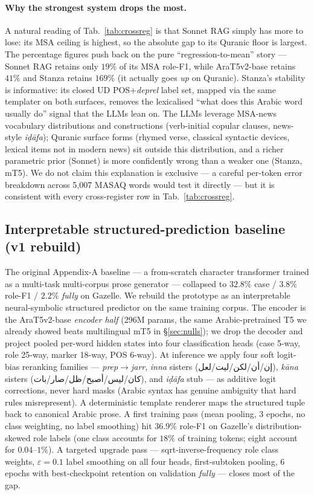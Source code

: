 \documentclass[10pt,a4paper,twocolumn]{article}
\providecommand{\textarabic}[1]{{\arabicfont #1}}
\begin{document}
\paragraph{Why the strongest system drops the most.} A natural reading of Tab.~\ref{tab:crossreg} is that Sonnet RAG simply has more to lose: its MSA ceiling is highest, so the absolute gap to its Quranic floor is largest. The percentage figures push back on the pure ``regression-to-mean'' story --- Sonnet RAG retains only $19\%$ of its MSA role-F1, while AraT5v2-base retains $41\%$ and Stanza retains $169\%$ (it actually goes \emph{up} on Quranic). Stanza's stability is informative: its closed UD POS+\emph{deprel} label set, mapped via the same templater on both surfaces, removes the lexicalised ``what does this Arabic word usually do'' signal that the LLMs lean on. The LLMs leverage MSA-news vocabulary distributions and constructions (verb-initial copular clauses, news-style \emph{i\d{d}\=afa}); Quranic surface forms (rhymed verse, classical syntactic devices, lexical items not in modern news) sit outside this distribution, and a richer parametric prior (Sonnet) is more confidently wrong than a weaker one (Stanza, mT5). We do not claim this explanation is exclusive --- a careful per-token error breakdown across 5{,}007 MASAQ words would test it directly --- but it is consistent with every cross-register row in Tab.~\ref{tab:crossreg}.

\subsection{Interpretable structured-prediction baseline (v1 rebuild)}
\label{sec:rebuild}

The original Appendix-A baseline --- a from-scratch character transformer trained as a multi-task multi-corpus prose generator --- collapsed to $32.8\%$ case / $3.8\%$ role-F1 / $2.2\%$ \emph{fully} on Gazelle. We rebuild the prototype as an interpretable neural-symbolic structured predictor on the same training corpus. The encoder is the AraT5v2-base \emph{encoder half} (296M params, the same Arabic-pretrained T5 we already showed beats multilingual mT5 in \S\ref{sec:nulls}); we drop the decoder and project pooled per-word hidden states into four classification heads (case 5-way, role 25-way, marker 18-way, POS 6-way). At inference we apply four soft logit-bias reranking families --- \emph{prep$\rightarrow$jarr}, \emph{inna} sisters (\textarabic{إن/أن/لكن/ليت/لعل}), \emph{k\=ana} sisters (\textarabic{كان/ليس/أصبح/ظل/صار/بات}), and \emph{i\d{d}\=afa} stub --- as additive logit corrections, never hard masks (Arabic syntax has genuine ambiguity that hard rules misrepresent). A deterministic template renderer maps the structured tuple back to canonical Arabic prose. A first training pass (mean pooling, 3 epochs, no class weighting, no label smoothing) hit $36.9\%$ role-F1 on Gazelle's distribution-skewed role labels (one class accounts for $18\%$ of training tokens; eight account for $0.04$--$1\%$). A targeted upgrade pass --- sqrt-inverse-frequency role class weights, $\varepsilon{=}0.1$ label smoothing on all four heads, first-subtoken pooling, 6 epochs with best-checkpoint retention on validation \emph{fully} --- closes most of the gap.
\end{document}

